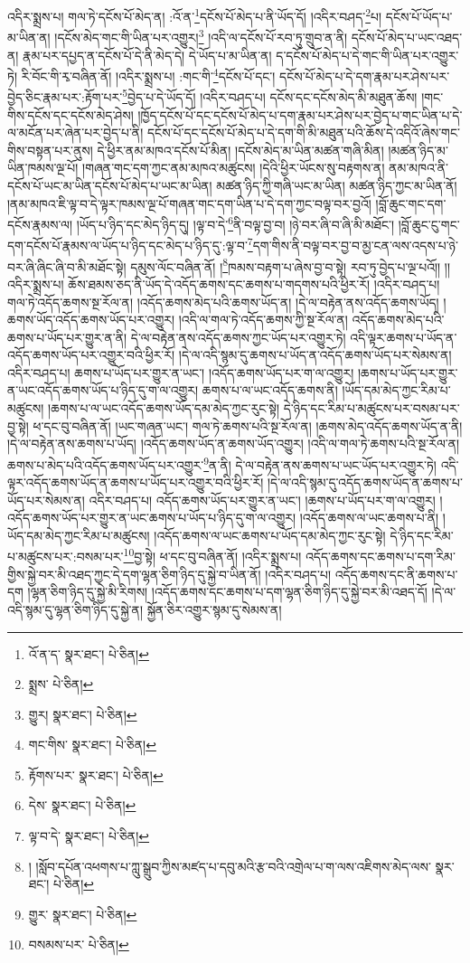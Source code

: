 འདིར་སྨྲས་པ། གལ་ཏེ་དངོས་པོ་མེད་ན། :འོ་ན་\footnote{འོ་ན་ད་  སྣར་ཐང་།  པེ་ཅིན། }དངོས་པོ་མེད་པ་ནི་ཡོད་དོ། །འདིར་བཤད་\footnote{སྨྲས་  པེ་ཅིན། }པ། དངོས་པོ་ཡོད་པ་མ་ཡིན་ན། །དངོས་མེད་གང་གི་ཡིན་པར་འགྱུར།\footnote{གྱུར།  སྣར་ཐང་།  པེ་ཅིན། } །འདི་ལ་དངོས་པོ་རབ་ཏུ་གྲུབ་ན་ནི། དངོས་པོ་མེད་པ་ཡང་འཐད་ན། རྣམ་པར་དཔྱད་ན་དངོས་པོ་དེ་ནི་མེད་དེ། དེ་ཡོད་པ་མ་ཡིན་ན། ད་དངོས་པོ་མེད་པ་དེ་གང་གི་ཡིན་པར་འགྱུར་ཏེ། རི་བོང་གི་རྭ་བཞིན་ནོ། །འདིར་སྨྲས་པ། :གང་གི་\footnote{གང་གིས་  སྣར་ཐང་།  པེ་ཅིན། }དངོས་པོ་དང་། དངོས་པོ་མེད་པ་དེ་དག་རྣམ་པར་ཤེས་པར་བྱེད་ཅིང་རྣམ་པར་:རྟོག་པར་\footnote{རྟོགས་པར་  སྣར་ཐང་།  པེ་ཅིན། }བྱེད་པ་དེ་ཡོད་དོ། །འདིར་བཤད་པ། དངོས་དང་དངོས་མེད་མི་མཐུན་ཆོས། །གང་གིས་དངོས་དང་དངོས་མེད་ཤེས། །ཁྱོད་དངོས་པོ་དང་དངོས་པོ་མེད་པ་དག་རྣམ་པར་ཤེས་པར་བྱེད་པ་གང་ཡིན་པ་དེ་ལ་མངོན་པར་ཞེན་པར་བྱེད་པ་ནི། དངོས་པོ་དང་དངོས་པོ་མེད་པ་དེ་དག་གི་མི་མཐུན་པའི་ཆོས་དེ་འདིའོ་ཞེས་གང་གིས་བསྟན་པར་ནུས། དེ་ཕྱིར་ནམ་མཁའ་དངོས་པོ་མིན། །དངོས་མེད་མ་ཡིན་མཚན་གཞི་མིན། །མཚན་ཉིད་མ་ཡིན་ཁམས་ལྔ་པོ། །གཞན་གང་དག་ཀྱང་ནམ་མཁའ་མཚུངས། །དེའི་ཕྱིར་ཡོངས་སུ་བརྟགས་ན། ནམ་མཁའ་ནི་དངོས་པོ་ཡང་མ་ཡིན་དངོས་པོ་མེད་པ་ཡང་མ་ཡིན། མཚན་ཉིད་ཀྱི་གཞི་ཡང་མ་ཡིན། མཚན་ཉིད་ཀྱང་མ་ཡིན་ནོ། །ནམ་མཁའ་ཇི་ལྟ་བ་དེ་ལྟར་ཁམས་ལྔ་པོ་གཞན་གང་དག་ཡིན་པ་དེ་དག་ཀྱང་བལྟ་བར་བྱའོ། །བློ་ཆུང་གང་དག་དངོས་རྣམས་ལ། །ཡོད་པ་ཉིད་དང་མེད་ཉིད་དུ། །ལྟ་བ་དེ་\footnote{དེས་  སྣར་ཐང་།  པེ་ཅིན། }ནི་བལྟ་བྱ་བ། །ཉེ་བར་ཞི་བ་ཞི་མི་མཐོང་། །བློ་ཆུང་ངུ་གང་དག་དངོས་པོ་རྣམས་ལ་ཡོད་པ་ཉིད་དང་མེད་པ་ཉིད་དུ་:ལྟ་བ་\footnote{ལྟ་བ་དེ་  སྣར་ཐང་།  པེ་ཅིན། }དག་གིས་ནི་བལྟ་བར་བྱ་བ་མྱ་ངན་ལས་འདས་པ་ཉེ་བར་ཞི་ཞིང་ཞི་བ་མི་མཐོང་སྟེ། དམུས་ལོང་བཞིན་ནོ། །\footnote{། །སློབ་དཔོན་འཕགས་པ་ཀླུ་སྒྲུབ་ཀྱིས་མཛད་པ་དབུ་མའི་རྩ་བའི་འགྲེལ་པ་ག་ལས་འཇིགས་མེད་ལས་  སྣར་ཐང་།  པེ་ཅིན། }ཁམས་བརྟག་པ་ཞེས་བྱ་བ་སྟེ། རབ་ཏུ་བྱེད་པ་ལྔ་པའོ།། །།འདིར་སྨྲས་པ། ཆོས་ཐམས་ཅད་ནི་ཡོད་དེ་འདོད་ཆགས་དང་ཆགས་པ་གདགས་པའི་ཕྱིར་རོ། །འདིར་བཤད་པ། གལ་ཏེ་འདོད་ཆགས་སྔ་རོལ་ན། །འདོད་ཆགས་མེད་པའི་ཆགས་ཡོད་ན། །དེ་ལ་བརྟེན་ནས་འདོད་ཆགས་ཡོད། །ཆགས་ཡོད་འདོད་ཆགས་ཡོད་པར་འགྱུར། །འདི་ལ་གལ་ཏེ་འདོད་ཆགས་ཀྱི་སྔ་རོལ་ན། འདོད་ཆགས་མེད་པའི་ཆགས་པ་ཡོད་པར་གྱུར་ན་ནི། དེ་ལ་བརྟེན་ནས་འདོད་ཆགས་ཀྱང་ཡོད་པར་འགྱུར་ཏེ། འདི་ལྟར་ཆགས་པ་ཡོད་ན་འདོད་ཆགས་ཡོད་པར་འགྱུར་བའི་ཕྱིར་རོ། །དེ་ལ་འདི་སྙམ་དུ་ཆགས་པ་ཡོད་ན་འདོད་ཆགས་ཡོད་པར་སེམས་ན། འདིར་བཤད་པ། ཆགས་པ་ཡོད་པར་གྱུར་ན་ཡང་། །འདོད་ཆགས་ཡོད་པར་ག་ལ་འགྱུར། །ཆགས་པ་ཡོད་པར་གྱུར་ན་ཡང་འདོད་ཆགས་ཡོད་པ་ཉིད་དུ་ག་ལ་འགྱུར། ཆགས་པ་ལ་ཡང་འདོད་ཆགས་ནི། །ཡོད་དམ་མེད་ཀྱང་རིམ་པ་མཚུངས། །ཆགས་པ་ལ་ཡང་འདོད་ཆགས་ཡོད་དམ་མེད་ཀྱང་རུང་སྟེ། དེ་ཉིད་དང་རིམ་པ་མཚུངས་པར་བསམ་པར་བྱ་སྟེ། ཕ་དང་བུ་བཞིན་ནོ། །ཡང་གཞན་ཡང་། གལ་ཏེ་ཆགས་པའི་སྔ་རོལ་ན། །ཆགས་མེད་འདོད་ཆགས་ཡོད་ན་ནི། །དེ་ལ་བརྟེན་ནས་ཆགས་པ་ཡོད། །འདོད་ཆགས་ཡོད་ན་ཆགས་ཡོད་འགྱུར། །འདི་ལ་གལ་ཏེ་ཆགས་པའི་སྔ་རོལ་ན། ཆགས་པ་མེད་པའི་འདོད་ཆགས་ཡོད་པར་འགྱུར་\footnote{གྱུར་  སྣར་ཐང་།  པེ་ཅིན། }ན་ནི། དེ་ལ་བརྟེན་ནས་ཆགས་པ་ཡང་ཡོད་པར་འགྱུར་ཏེ། འདི་ལྟར་འདོད་ཆགས་ཡོད་ན་ཆགས་པ་ཡོད་པར་འགྱུར་བའི་ཕྱིར་རོ། །དེ་ལ་འདི་སྙམ་དུ་འདོད་ཆགས་ཡོད་ན་ཆགས་པ་ཡོད་པར་སེམས་ན། འདིར་བཤད་པ། འདོད་ཆགས་ཡོད་པར་གྱུར་ན་ཡང་། །ཆགས་པ་ཡོད་པར་ག་ལ་འགྱུར། །འདོད་ཆགས་ཡོད་པར་གྱུར་ན་ཡང་ཆགས་པ་ཡོད་པ་ཉིད་དུ་ག་ལ་འགྱུར། །འདོད་ཆགས་ལ་ཡང་ཆགས་པ་ནི། །ཡོད་དམ་མེད་ཀྱང་རིམ་པ་མཚུངས། །འདོད་ཆགས་ལ་ཡང་ཆགས་པ་ཡོད་དམ་མེད་ཀྱང་རུང་སྟེ། དེ་ཉིད་དང་རིམ་པ་མཚུངས་པར་:བསམ་པར་\footnote{བསམས་པར་  པེ་ཅིན། }བྱ་སྟེ། ཕ་དང་བུ་བཞིན་ནོ། །འདིར་སྨྲས་པ། འདོད་ཆགས་དང་ཆགས་པ་དག་རིམ་གྱིས་སྐྱེ་བར་མི་འཐད་ཀྱང་དེ་དག་ལྷན་ཅིག་ཉིད་དུ་སྐྱེ་བ་ཡིན་ནོ། །འདིར་བཤད་པ། འདོད་ཆགས་དང་ནི་ཆགས་པ་དག །ལྷན་ཅིག་ཉིད་དུ་སྐྱེ་མི་རིགས། །འདོད་ཆགས་དང་ཆགས་པ་དག་ལྷན་ཅིག་ཉིད་དུ་སྐྱེ་བར་མི་འཐད་དོ། །དེ་ལ་འདི་སྙམ་དུ་ལྷན་ཅིག་ཉིད་དུ་སྐྱེ་ན། སྐྱོན་ཅིར་འགྱུར་སྙམ་དུ་སེམས་ན། 